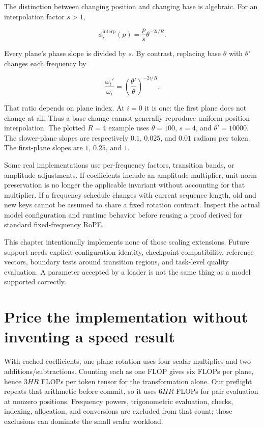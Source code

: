 The distinction between changing position and changing base is
algebraic. For an interpolation factor \(s>1\),

\begin{equation}
\phi_i^{\mathrm{interp}}(p)=\frac{p}{s}\theta^{-2i/R}.
\end{equation}

Every plane's phase slope is divided by \(s\). By contrast, replacing
base \(\theta\) with \(\theta'\) changes each frequency by

\begin{equation}
\frac{\omega_i'}{\omega_i}
=\left(\frac{\theta'}{\theta}\right)^{-2i/R}.
\end{equation}

That ratio depends on plane index. At \(i=0\) it is one: the first plane
does not change at all. Thus a base change cannot generally reproduce
uniform position interpolation. The plotted \(R=4\) example uses
\(\theta=100\), \(s=4\), and \(\theta'=10000\). The slower-plane slopes
are respectively \(0.1\), \(0.025\), and \(0.01\) radians per token. The
first-plane slopes are \(1\), \(0.25\), and \(1\).

Some real implementations use per-frequency factors, transition bands,
or amplitude adjustments. If coefficients include an amplitude
multiplier, unit-norm preservation is no longer the applicable invariant
without accounting for that multiplier. If a frequency schedule changes
with current sequence length, old and new keys cannot be assumed to
share a fixed rotation contract. Inspect the actual model configuration
and runtime behavior before reusing a proof derived for standard
fixed-frequency RoPE.

This chapter intentionally implements none of those scaling extensions.
Future support needs explicit configuration identity, checkpoint
compatibility, reference vectors, boundary tests around transition
regions, and task-level quality evaluation. A parameter accepted by a
loader is not the same thing as a model supported correctly.

\section{Price the implementation without inventing a speed
result}\label{price-the-implementation-without-inventing-a-speed-result}

With cached coefficients, one plane rotation uses four scalar multiplies
and two additions/subtractions. Counting each as one FLOP gives six
FLOPs per plane, hence \(3HR\) FLOPs per token tensor for the
transformation alone. Our preflight repeats that arithmetic before
commit, so it uses \(6HR\) FLOPs for pair evaluation at nonzero
positions. Frequency powers, trigonometric evaluation, checks, indexing,
allocation, and conversions are excluded from that count; those
exclusions can dominate the small scalar workload.

